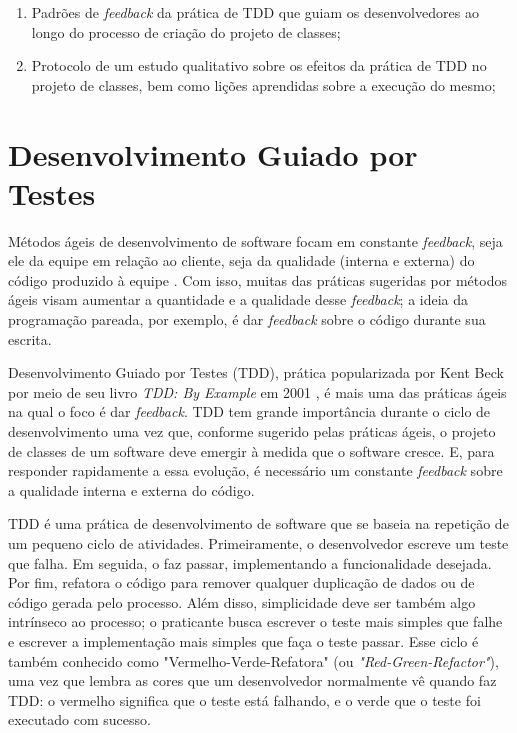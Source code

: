 \documentclass[conference]{IEEEtran}
\begin{document}
\begin{enumerate}
	\item Padrões de \textit{feedback} da prática de TDD que guiam os desenvolvedores
	ao longo do processo de criação do projeto de classes;

	\item Protocolo de um estudo qualitativo sobre os efeitos da prática
	de TDD no projeto de classes, bem como lições aprendidas sobre a execução do mesmo;
		
\end{enumerate}

\section{Desenvolvimento Guiado por Testes}

Métodos ágeis de desenvolvimento de software focam em constante
\textit{feedback}, seja ele da equipe em relação ao cliente, seja da
qualidade (interna e externa) do código produzido à equipe \cite{AgileManifesto}.
Com isso, muitas das práticas sugeridas por métodos ágeis visam aumentar a 
quantidade e a qualidade desse \textit{feedback}; a ideia da programação pareada, por
exemplo, é dar \textit{feedback} sobre o código durante sua escrita.

Desenvolvimento Guiado por Testes (TDD), prática popularizada por Kent Beck por meio de seu livro
\textit{TDD: By Example} em 2001 \cite{TDDByExample}, é mais uma das práticas
ágeis na qual o foco é dar \textit{feedback}. TDD tem grande importância durante o ciclo
de desenvolvimento uma vez que, conforme sugerido pelas práticas ágeis, o projeto de classes de um
software deve emergir à medida que o software cresce. E, para responder
rapidamente a essa evolução, é necessário um constante \textit{feedback} sobre a
qualidade interna e externa do código.

TDD é uma prática de desenvolvimento de software que se baseia na repetição de
um pequeno ciclo de atividades. Primeiramente, o desenvolvedor escreve um
teste que falha. Em seguida, o faz passar, implementando a
funcionalidade desejada. Por fim, refatora o código para remover qualquer
duplicação de dados ou de código gerada pelo processo.
Além disso, simplicidade deve ser também algo intrínseco ao processo; o praticante
busca escrever o teste mais simples que falhe e escrever a implementação mais simples
que faça o teste passar.
Esse ciclo
é também conhecido como 
"Vermelho-Verde-Refatora" (ou \textit{"Red-Green-Refactor"}), uma vez que lembra as cores que um 
desenvolvedor normalmente vê quando faz TDD: o vermelho significa que
o teste está falhando, e o verde que o teste foi executado com sucesso.
\end{document}
